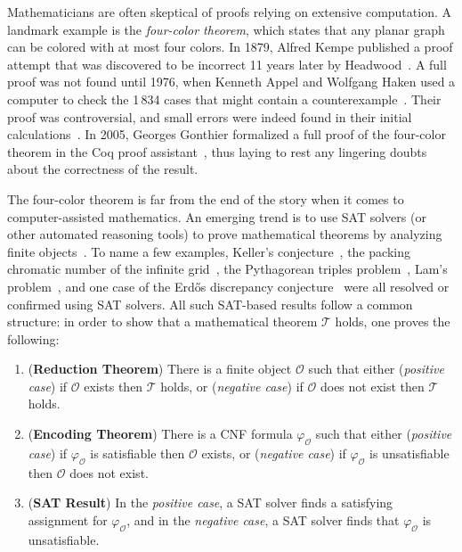 Mathematicians are often skeptical of proofs relying on extensive computation.
A landmark example is the \emph{four-color theorem}, which states that any planar graph can be colored with at most four colors. 
In 1879, Alfred Kempe published a proof attempt that was discovered to be incorrect 11 years later by Headwood~\cite{Walters2004ItAT,Wilson2002GraphsCA}.
A full proof was not found until 1976, when Kenneth Appel and Wolfgang Haken used a computer to check the 1\,834 cases that might contain a counterexample~\cite{appelFourColorProblem1978}.
Their proof was controversial, and small errors were indeed found in their initial calculations~\cite{Walters2004ItAT,Wilson2002GraphsCA}.
In 2005, Georges Gonthier formalized a full proof of the four-color theorem in the \textsf{Coq} proof assistant~\cite{gonthierFourColourTheorem2008a}, thus laying to rest any lingering doubts about the correctness of the result.

The four-color theorem is far from the end of the story when it comes to computer-assisted mathematics.
An emerging trend is to use SAT solvers (or other automated reasoning tools) to prove mathematical theorems by analyzing finite objects~\cite{avigad2023mathematics}. 
To name a few examples,
Keller's conjecture~\cite{brakensiek2023resolution},
the packing chromatic number of the infinite grid~\cite{Subercaseaux_Heule_2023},
the Pythagorean triples problem~\cite{Heule_2016},
Lam's problem~\cite{21bright_sat_based_resolution_lams_problem},
and one case of the Erd\H{o}s discrepancy conjecture~\cite{konev2014sat}
were all resolved or confirmed using SAT solvers.
All such SAT-based results follow a common structure: in order to show that a mathematical theorem $\mathcal{T}$ holds, one proves the following:

\begin{enumerate}
  \item (\textbf{Reduction Theorem}) There is a finite object $\mathcal{O}$ such that either (\emph{positive case}) if $\mathcal{O}$ exists then $\mathcal{T}$ holds, or (\emph{negative case}) if $\mathcal{O}$ does not exist then $\mathcal{T}$ holds. %
  \item (\textbf{Encoding Theorem}) There is a CNF formula $\varphi_{\mathcal{O}}$ such that either (\emph{positive case}) if $\varphi_{\mathcal{O}}$ is satisfiable then $\mathcal{O}$ exists, or (\emph{negative case}) if $\varphi_{\mathcal{O}}$ is unsatisfiable then $\mathcal{O}$ does not exist.
  \item (\textbf{SAT Result}) In the \emph{positive case}, a SAT solver finds a satisfying assignment for $\varphi_{\mathcal{O}}$, and in the \emph{negative case}, a SAT solver finds that $\varphi_{\mathcal{O}}$ is unsatisfiable.
\end{enumerate}

